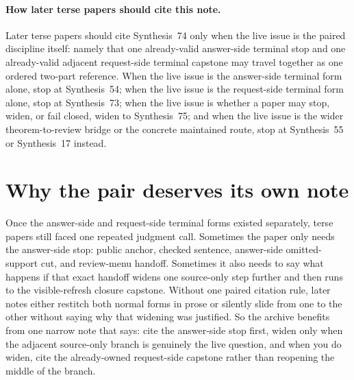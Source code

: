 \documentclass[11pt]{article}
\begin{document}
\paragraph{How later terse papers should cite this note.}
Later terse papers should cite Synthesis~74 only when the live issue is the paired discipline itself: namely that one already-valid answer-side terminal stop and one already-valid adjacent request-side terminal capstone may travel together as one ordered two-part reference. When the live issue is the answer-side terminal form alone, stop at Synthesis~54; when the live issue is the request-side terminal form alone, stop at Synthesis~73; when the live issue is whether a paper may stop, widen, or fail closed, widen to Synthesis~75; and when the live issue is the wider theorem-to-review bridge or the concrete maintained route, stop at Synthesis~55 or Synthesis~17 instead.\cite{series:challengeanswerreviewmenus,series:publicrequestresponsepacketrefreshresponsepacketclosureverdicts,series:pairedterminalcutoverrule,series:seriesspines,series:workedexample}

\section{Why the pair deserves its own note}
Once the answer-side and request-side terminal forms existed separately, terse papers still faced one repeated judgment call.
Sometimes the paper only needs the answer-side stop: public anchor, checked sentence, answer-side omitted-support cut, and review-menu handoff.
Sometimes it also needs to say what happens if that exact handoff widens one source-only step further and then runs to the visible-refresh closure capstone.
Without one paired citation rule, later notes either restitch both normal forms in prose or silently slide from one to the other without saying why that widening was justified.
So the archive benefits from one narrow note that says: cite the answer-side stop first, widen only when the adjacent source-only branch is genuinely the live question, and when you do widen, cite the already-owned request-side capstone rather than reopening the middle of the branch.
\end{document}
